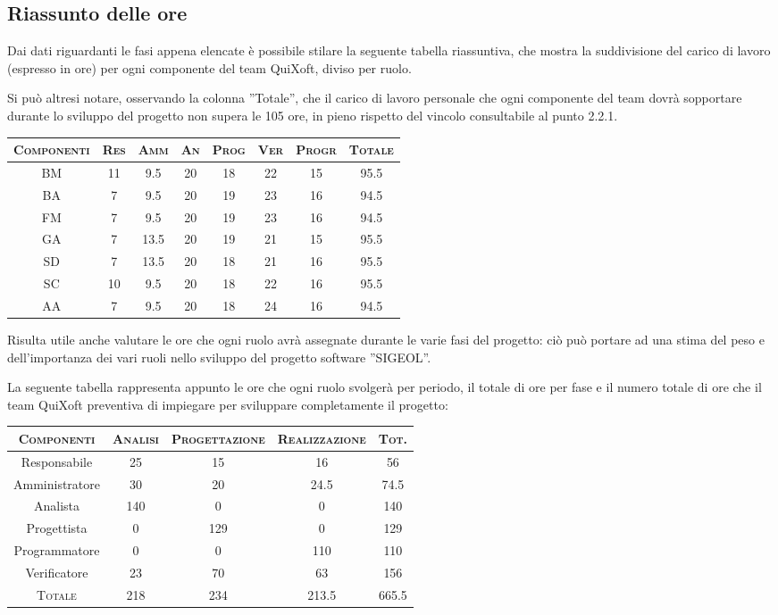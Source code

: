 \documentclass[11pt,a4paper]{article}
\begin{document}
\subsection{Riassunto delle ore}
Dai dati riguardanti le fasi appena elencate è possibile stilare la seguente tabella riassuntiva, che mostra la suddivisione del carico di lavoro (espresso in ore) per ogni componente del team QuiXoft, diviso per ruolo.

Si può altresi notare, osservando la colonna ''Totale'', che il carico di lavoro personale che ogni componente del team dovrà sopportare durante lo sviluppo del progetto non supera le 105 ore, in pieno rispetto del vincolo consultabile al punto 2.2.1.
\\ \bigskip
\begin{center}
\begin{tabular}{|c||c|c|c|c|c|c||c|}
\hline
\textsc{Componenti} & \textsc{Res} & \textsc{Amm} & \textsc{An} & \textsc{Prog} & \textsc{Ver} & \textsc{Progr} & \textsc{Totale}\\
\hline \hline
BM & 11 & 9.5 & 20 & 18 & 22 & 15 & 95.5 \\ \hline
BA & 7 & 9.5 & 20 & 19 & 23 & 16 & 94.5 \\ \hline
FM & 7 & 9.5 & 20 & 19 & 23 & 16 & 94.5 \\ \hline
GA & 7 & 13.5 & 20 & 19 & 21 & 15 & 95.5 \\ \hline
SD & 7 & 13.5 & 20 & 18 & 21 & 16 & 95.5 \\ \hline
SC & 10 & 9.5 & 20 & 18 & 22 & 16 & 95.5 \\ \hline
AA & 7 & 9.5 & 20 & 18 & 24 & 16 & 94.5 \\ \hline
\end{tabular}
\end{center}
\bigskip \bigskip \bigskip

Risulta utile anche valutare le ore che ogni ruolo avrà assegnate durante le varie fasi del progetto: ciò può portare ad una stima del peso e dell'importanza dei vari ruoli nello sviluppo del progetto software ''SIGEOL''.

La seguente tabella rappresenta appunto le ore che ogni ruolo svolgerà per periodo, il totale di ore per fase e il numero totale di ore che il team QuiXoft preventiva di impiegare per sviluppare completamente il progetto:
\begin{center}
\begin{tabular}{|c||c|c|c||c|}
\hline
\textsc{Componenti}& \textsc{Analisi} & \textsc{Progettazione} & \textsc{Realizzazione} & \textsc{Tot.} \\ \hline \hline
Responsabile & 25 & 15 & 16 & 56 \\ \hline
Amministratore & 30 & 20 & 24.5 & 74.5 \\ \hline
Analista & 140 & 0 & 0 & 140 \\ \hline
Progettista & 0 & 129 & 0 & 129 \\ \hline
Programmatore & 0 & 0 & 110 & 110 \\ \hline
Verificatore & 23 & 70 & 63 & 156 \\ \hline \hline
\textsc{Totale} & 218 & 234 & 213.5 & 665.5 \\ \hline
\end{tabular}
\end{center}
\bigskip
\end{document}
